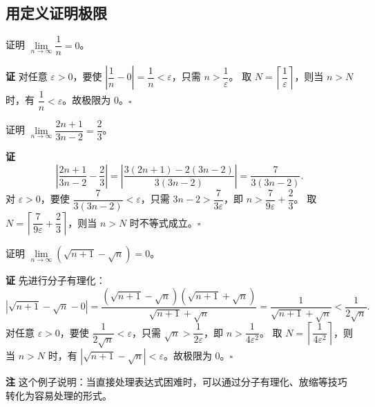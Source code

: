\documentclass[fontset=fandol]{ctexart}
\newenvironment{custom}[1]{\par\noindent\textbf{#1}\quad}{\par\vspace{0.8em}}
\begin{document}
\subsection{用定义证明极限}

\begin{example}
证明 \(\lim\limits_{n\to\infty} \dfrac{1}{n} = 0\)。
\end{example}
\begin{custom}{证}
对任意 \(\varepsilon > 0\)，要使 \(\left|\dfrac{1}{n} - 0\right| = \dfrac{1}{n} < \varepsilon\)，只需 \(n > \dfrac{1}{\varepsilon}\)。
取 \(N = \left\lceil \dfrac{1}{\varepsilon} \right\rceil\)，则当 \(n > N\) 时，有 \(\dfrac{1}{n} < \varepsilon\)。故极限为 0。\(\square\)
\end{custom}

\begin{example}
证明 \(\lim\limits_{n\to\infty} \dfrac{2n+1}{3n-2} = \dfrac{2}{3}\)。
\end{example}
\begin{custom}{证}
\[
\left|\dfrac{2n+1}{3n-2} - \dfrac{2}{3}\right| = \left|\dfrac{3(2n+1)-2(3n-2)}{3(3n-2)}\right| = \dfrac{7}{3(3n-2)}.
\]
对 \(\varepsilon > 0\)，要使 \(\dfrac{7}{3(3n-2)} < \varepsilon\)，只需 \(3n-2 > \dfrac{7}{3\varepsilon}\)，即 \(n > \dfrac{7}{9\varepsilon} + \dfrac{2}{3}\)。
取 \(N = \left\lceil \dfrac{7}{9\varepsilon} + \dfrac{2}{3} \right\rceil\)，则当 \(n > N\) 时不等式成立。\(\square\)
\end{custom}

\begin{example}
证明 \(\lim\limits_{n\to\infty} \left(\sqrt{n+1} - \sqrt{n}\right) = 0\)。
\end{example}
\begin{custom}{证}
先进行分子有理化：
\[
\left|\sqrt{n+1} - \sqrt{n} - 0\right| = \dfrac{(\sqrt{n+1} - \sqrt{n})(\sqrt{n+1} + \sqrt{n})}{\sqrt{n+1} + \sqrt{n}} = \dfrac{1}{\sqrt{n+1} + \sqrt{n}} < \dfrac{1}{2\sqrt{n}}.
\]
对任意 \(\varepsilon > 0\)，要使 \(\dfrac{1}{2\sqrt{n}} < \varepsilon\)，只需 \(\sqrt{n} > \dfrac{1}{2\varepsilon}\)，即 \(n > \dfrac{1}{4\varepsilon^2}\)。
取 \(N = \left\lceil \dfrac{1}{4\varepsilon^2} \right\rceil\)，则当 \(n > N\) 时，有 \(\left|\sqrt{n+1} - \sqrt{n}\right| < \varepsilon\)。故极限为 0。\(\square\)
\end{custom}

\begin{custom}{注}
这个例子说明：当直接处理表达式困难时，可以通过分子有理化、放缩等技巧转化为容易处理的形式。
\end{custom}
\end{document}
